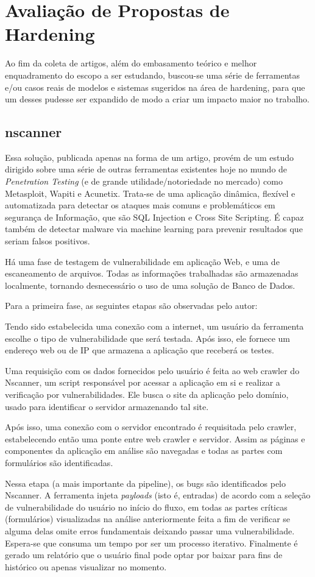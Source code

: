 \section{Avaliação de Propostas de Hardening}
Ao fim da coleta de artigos, além do embasamento teórico e melhor enquadramento do escopo a ser estudando, buscou-se uma série de ferramentas e/ou casos reais de modelos e sistemas sugeridos na área de hardening, para que um desses pudesse ser expandido de modo a criar um impacto maior no trabalho.

\subsection{nscanner}
Essa solução, publicada apenas na forma de um artigo, provém de um estudo dirigido sobre uma série de outras ferramentas existentes hoje no mundo de \textit{Penetration Testing} (e de grande utilidade/notoriedade no mercado) como Metasploit, Wapiti e Acunetix. Trata-se de uma aplicação dinâmica, flexível e automatizada para detectar os ataques mais comuns e problemáticos em segurança de Informação, que são SQL Injection e Cross Site Scripting. É capaz também de detectar malware via machine learning para prevenir resultados que seriam falsos positivos.

Há uma fase de testagem de vulnerabilidade em aplicação Web, e uma de escaneamento de arquivos. Todas as informações trabalhadas são armazenadas localmente, tornando desnecessário o uso de uma solução de Banco de Dados. 

Para a primeira fase, as seguintes etapas são observadas pelo autor:
\begin{alineas}
\item Tendo sido estabelecida uma conexão com a internet, um usuário da ferramenta escolhe o tipo de vulnerabilidade que será testada. Após isso, ele fornece um endereço web ou de IP que armazena a aplicação que receberá os testes.
\item Uma requisição com os dados fornecidos pelo usuário é feita ao web crawler do Nscanner, um script responsável por acessar a aplicação em si e realizar a verificação por vulnerabilidades. Ele busca o site da aplicação pelo domínio, usado para identificar o servidor armazenando tal site.
\item Após isso, uma conexão com o servidor encontrado é requisitada pelo crawler, estabelecendo então uma ponte entre web crawler e servidor. Assim as páginas e componentes da aplicação em análise são navegadas e todas as partes com formulários são identificadas.
\item Nessa etapa (a mais importante da pipeline), os bugs são identificados pelo Nscanner. A ferramenta injeta \textit{payloads} (isto é, entradas) de acordo com a seleção de vulnerabilidade do usuário no início do fluxo, em todas as partes críticas (formulários) visualizadas na análise anteriormente feita a fim de verificar se alguma delas omite erros fundamentais deixando passar uma vulnerabilidade. Espera-se que consuma um tempo por ser um processo iterativo. Finalmente é gerado um relatório que o usuário final pode optar por baixar para fins de histórico ou apenas visualizar no momento.
\end{alineas}

